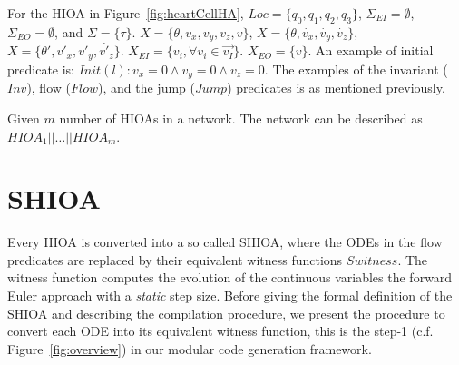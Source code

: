 For the \ac{HIOA} in Figure~\ref{fig:heartCellHA},
$Loc=\{q_{0},q_{1},q_{2},q_{3}\}$, $\Sigma_{EI} = \emptyset$,
$\Sigma_{EO}=\emptyset$, and
$\Sigma=\{\tau\}$. $X=\{\theta,v_{x},v_{y},v_{z},v\}$,
\mbox{$X=\{\dot{\theta},\dot{v_{x}},\dot{v_{y}},\dot{v_{z}}\}$},
\mbox{$X=\{\theta',{v'_{x}},{v'_{y}},\dot{v'_{z}}\}$}.
$X_{EI}=\{v_{i}, \forall v_{i} \in \vec{v_{I}}\}$.  $X_{EO}=\{v\}$. An
example of initial predicate is:
$Init(l): v_{x}=0 \wedge v_{y}=0 \wedge v_{z}=0$. The examples of the
invariant ($Inv$), flow ($Flow$), and the jump ($Jump$) predicates is as
mentioned previously.


{\color{red} Given $m$ number of \acp{HIOA} in a network.  The network
  can be described as $HIOA_1 || \dots || HIOA_m$.}


\section{\acf{SHIOA}}
\label{sec:SHA}

Every \ac{HIOA} is converted into a so called \ac{SHIOA}, where the ODEs
in the flow predicates are replaced by their equivalent witness
functions $Switness$. The witness function computes the evolution of the
continuous variables the forward Euler approach with a \emph{static}
step size. Before giving the formal definition of the \ac{SHIOA} and
describing the compilation procedure, we present the procedure to
convert each ODE into its equivalent witness function, this is the
step-1 (c.f. Figure~\ref{fig:overview}) in our modular code generation
framework.

